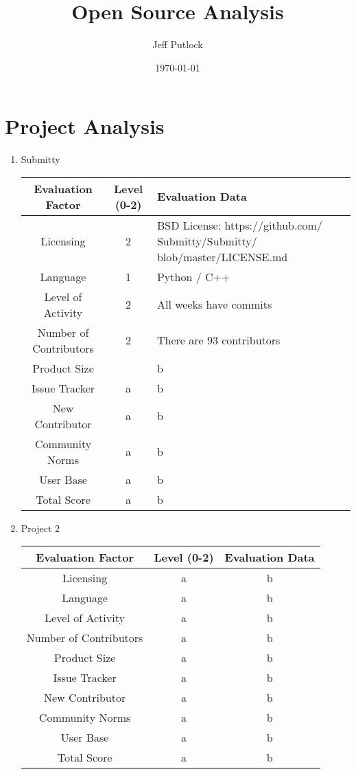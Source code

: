 \documentclass[12pt]{article}
\author{Jeff Putlock}
\date{\today}
\title{Open Source Analysis}
\begin{document}
	
	\maketitle
	
	\section{Project Analysis}
	
	\begin{enumerate}
		\item Submitty
		
		\noindent\begin{tabular}{ | c | c | p{5cm} | } 
			\hline
			Evaluation Factor & Level (0-2) & Evaluation Data \\\hline
			Licensing & 2 & BSD License: https://github.com/ Submitty/Submitty/ blob/master/LICENSE.md \\\hline
			Language & 1 & Python / C++ \\\hline
			Level of Activity & 2 & All weeks have commits \\\hline		
			Number of Contributors & 2 & There are 93 contributors \\\hline
			Product Size &  & b \\\hline
			Issue Tracker & a & b \\\hline
			New Contributor & a & b \\\hline
			Community Norms & a & b \\\hline
			User Base & a & b \\\hline
			Total Score & a & b \\\hline
		\end{tabular}
	
		\item Project 2
		
		\noindent\begin{tabular}{ |c|c|c| } 
			\hline
			Evaluation Factor & Level (0-2) & Evaluation Data \\\hline
			Licensing & a & b \\\hline
			Language & a & b \\\hline
			Level of Activity & a & b \\\hline		
			Number of Contributors & a & b \\\hline
			Product Size & a & b \\\hline
			Issue Tracker & a & b \\\hline
			New Contributor & a & b \\\hline
			Community Norms & a & b \\\hline
			User Base & a & b \\\hline
			Total Score & a & b \\\hline
		\end{tabular}
	

\end{enumerate}
\end{document}
